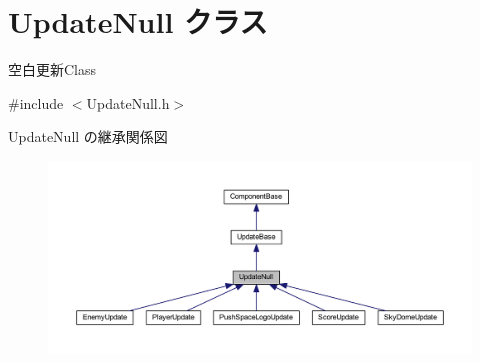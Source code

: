 \hypertarget{class_update_null}{}\section{Update\+Null クラス}
\label{class_update_null}


空白更新\+Class  




{\ttfamily \#include $<$Update\+Null.\+h$>$}



Update\+Null の継承関係図\nopagebreak
\begin{figure}[H]
\begin{center}
\leavevmode
\includegraphics[width=350pt]{class_update_null__inherit__graph}
\end{center}
\end{figure}

